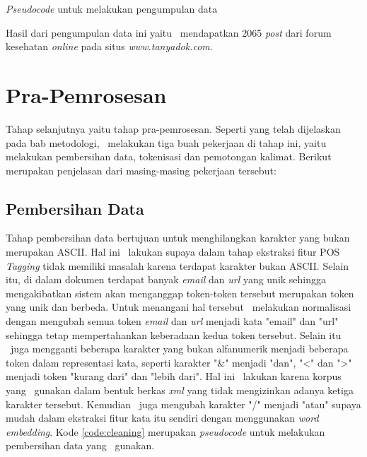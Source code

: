 \begin{kode}\label{(kode_crawling)}
	
	\label{code:crawl}	
	\caption{\textit{Pseudocode} untuk melakukan pengumpulan data}	
\end{kode}

Hasil dari pengumpulan data ini yaitu \saya~mendapatkan 2065 \textit{post} dari forum kesehatan \textit{online} pada situs \textit{www.tanyadok.com}.

\section{Pra-Pemrosesan}
Tahap selanjutnya yaitu tahap pra-pemrosesan. Seperti yang telah dijelaskan pada bab metodologi, \saya~melakukan tiga buah pekerjaan di tahap ini, yaitu melakukan pembersihan data, tokenisasi dan pemotongan kalimat. Berikut merupakan penjelasan dari masing-masing pekerjaan tersebut:

\subsection{Pembersihan Data}
Tahap pembersihan data bertujuan untuk menghilangkan karakter yang bukan merupakan ASCII. Hal ini \saya~lakukan supaya dalam tahap ekstraksi fitur POS \textit{Tagging} tidak memiliki masalah karena terdapat karakter bukan ASCII. Selain itu, di dalam dokumen terdapat banyak \textit{email} dan \textit{url} yang unik sehingga mengakibatkan sistem akan menganggap token-token tersebut merupakan token yang unik dan berbeda. Untuk menangani hal tersebut \saya~melakukan normalisasi dengan mengubah semua token \textit{email} dan \textit{url} menjadi kata "email" dan "url" sehingga tetap mempertahankan keberadaan kedua token tersebut. Selain itu \saya~juga mengganti beberapa karakter yang bukan alfanumerik menjadi beberapa token dalam representasi kata, seperti karakter "\&" menjadi "dan", "\textless" dan "\textgreater" menjadi token "kurang dari" dan "lebih dari". Hal ini \saya~lakukan karena korpus yang \saya~gunakan dalam bentuk berkas \textit{xml} yang tidak mengizinkan adanya ketiga karakter tersebut. Kemudian \saya~juga mengubah karakter "/" menjadi "atau" supaya mudah dalam ekstraksi fitur kata itu sendiri dengan menggunakan \textit{word embedding}. Kode \ref{code:cleaning} merupakan \textit{pseudocode} untuk melakukan pembersihan data yang \saya~gunakan.


